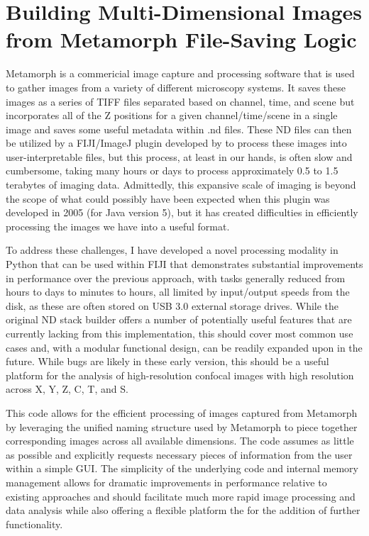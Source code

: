 \section{Building Multi\hyp{}Dimensional Images from Metamorph File\hyp{}Saving Logic}\label{metamorph}

Metamorph is a commericial image capture and processing software that is used to gather images from a variety of different microscopy systems. It saves these images as a series of TIFF files separated based on channel, time, and scene but incorporates all of the Z positions for a given channel/time/scene in a single image and saves some useful metadata within .nd files. These ND files can then be utilized by a FIJI/ImageJ plugin developed by \citet{Cordelieres2005} to process these images into user-interpretable files, but this process, at least in our hands, is often slow and cumbersome, taking many hours or days to process approximately 0.5 to 1.5 terabytes of imaging data. Admittedly, this expansive scale of imaging is beyond the scope of what could possibly have been expected when this plugin was developed in 2005 (for Java version 5), but it has created difficulties in efficiently processing the images we have into a useful format. 

To address these challenges, I have developed a novel processing modality in Python that can be used within FIJI that demonstrates substantial improvements in performance over the previous approach, with tasks generally reduced from hours to days to minutes to hours, all limited by input/output speeds from the disk, as these are often stored on USB 3.0 external storage drives. While the original ND stack builder offers a number of potentially useful features that are currently lacking from this implementation, this should cover most common use cases and, with a modular functional design, can be readily expanded upon in the future. While bugs are likely in these early version, this should be a useful platform for the analysis of high-resolution confocal images with high resolution across X, Y, Z, C, T, and S. 

\begin{code}
\caption{This code allows for the efficient processing of images captured from Metamorph by leveraging the unified naming structure used by Metamorph to piece together corresponding images across all available dimensions. The code assumes as little as possible and explicitly requests necessary pieces of information from the user within a simple GUI. The simplicity of the underlying code and internal memory management allows for dramatic improvements in performance relative to existing approaches and should facilitate much more rapid image processing and data analysis while also offering a flexible platform the for the addition of further functionality.}
\label{metamorpher}

\inputminted[breaklines,frame=single,fontsize=\small]{python}{source/metamorphTimeLapse.py}

\end{code}

